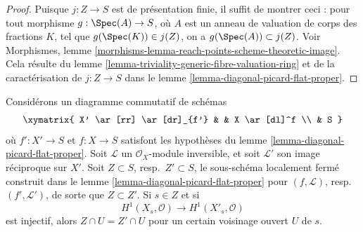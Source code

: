 \begin{proof}
Puisque $j : Z \to S$ est de présentation finie, il suffit
de montrer ceci : pour tout morphisme $g : \Spec(A) \to S$, où $A$ est un
anneau de valuation de corps des fractions $K$, tel que $g(\Spec(K)) \in j(Z)$,
on a $g(\Spec(A)) \subset j(Z)$. Voir
Morphismes, lemme \ref{morphisms-lemma-reach-points-scheme-theoretic-image}.
Cela résulte du lemme \ref{lemma-triviality-generic-fibre-valuation-ring}
et de la caractérisation de $j : Z \to S$ dans le
lemme \ref{lemma-diagonal-picard-flat-proper}.
\end{proof}

\begin{lemma}
\label{lemma-H1-O-picard-flat-proper}
Considérons un diagramme commutatif de schémas
$$
\xymatrix{
X' \ar[rr] \ar[dr]_{f'} & & X \ar[dl]^f \\
& S
}
$$
où $f' : X' \to S$ et $f : X \to S$ satisfont les hypothèses du
lemme \ref{lemma-diagonal-picard-flat-proper}.
Soit $\mathcal{L}$ un $\mathcal{O}_X$-module inversible,
et soit $\mathcal{L}'$ son image réciproque sur $X'$. Soit $Z \subset S$,
resp.\ $Z' \subset S$, le sous-schéma localement fermé construit
dans le lemme \ref{lemma-diagonal-picard-flat-proper}
pour $(f, \mathcal{L})$, resp.\ $(f', \mathcal{L}')$,
de sorte que $Z \subset Z'$. Si $s \in Z$ et si
$$
H^1(X_s, \mathcal{O}) \longrightarrow H^1(X'_s, \mathcal{O})
$$
est injectif, alors $Z \cap U = Z' \cap U$ pour un certain voisinage ouvert
$U$ de $s$.
\end{lemma}

